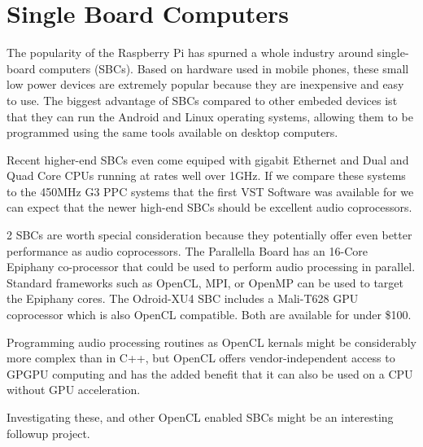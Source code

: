 \section{Single Board Computers}

The popularity of the Raspberry Pi has spurned a whole industry around single-board computers (SBCs). Based on hardware used in mobile phones, these small low power devices are extremely popular because they are inexpensive and easy to use. The biggest advantage of SBCs compared to other embeded devices ist that they can run the Android and Linux operating systems, allowing them to be programmed using the same tools available on desktop computers.

Recent higher-end SBCs even come equiped with gigabit Ethernet and Dual and Quad Core CPUs running at rates well over 1GHz. If we compare these systems to the 450MHz G3 PPC systems that the first VST Software was available for we can expect that the newer high-end SBCs should be excellent audio coprocessors.

2 SBCs are worth special consideration because they potentially offer even better performance as audio coprocessors. The Parallella Board has an 16-Core Epiphany co-processor that could be used to perform audio processing in parallel. Standard frameworks such as OpenCL, MPI, or OpenMP can be used to target the Epiphany cores. The Odroid-XU4 SBC includes a Mali-T628 GPU coprocessor which is also OpenCL compatible. Both are available for under \$100.

Programming audio processing routines as OpenCL kernals might be considerably more complex than in C++, but OpenCL offers vendor-independent access to GPGPU computing and has the added benefit that it can also be used on a CPU without GPU acceleration\cite{vst-gpu}.

Investigating these, and other OpenCL enabled SBCs might be an interesting followup project.